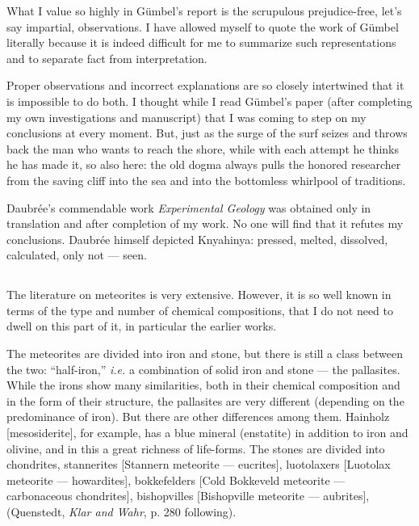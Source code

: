 \documentclass[a4paper, 12pt, oneside]{article}
\begin{document}
What I value so highly in Gümbel's report is the scrupulous prejudice-free, let's say impartial, observations. I have allowed myself to quote the work of Gümbel literally because it is indeed difficult for me to summarize such representations and to separate fact from interpretation.

Proper observations and incorrect explanations are so closely intertwined that it is impossible to do both. I thought while I read Gümbel's paper (after completing my own investigations and manuscript) that I was coming to step on my conclusions at every moment. But, just as the surge of the surf seizes and throws back the man who wants to reach the shore, while with each attempt he thinks he has made it, so also here: the old dogma always pulls the honored researcher from the saving cliff into the sea and into the bottomless whirlpool of traditions.

Daubrée's commendable work \emph{Experimental Geology} was obtained only in translation and after completion of my work. No one will find that it refutes my conclusions. Daubrée himself depicted Knyahinya: pressed, melted, dissolved, calculated, only not --- seen.
\clearpage
\subsection{}
\paragraph*{}
The literature on meteorites is very extensive. However, it is so well known in terms of the type and number of chemical compositions, that I do not need to dwell on this part of it, in particular the earlier works.

The meteorites are divided into iron and stone, but there is still a class between the two: ``half-iron,'' \emph{i.e.} a combination of solid iron and stone --- the pallasites. While the irons show many similarities, both in their chemical composition and in the form of their structure, the pallasites are very different (depending on the predominance of iron). But there are other differences among them. Hainholz [mesosiderite], for example, has a blue mineral (enstatite) in addition to iron and olivine, and in this a great richness of life-forms. The stones are divided into chondrites, stannerites [Stannern meteorite --- eucrites], luotolaxers [Luotolax meteorite --- howardites], bokkefelders [Cold Bokkeveld meteorite --- carbonaceous chondrites], bishopvilles [Bishopville meteorite --- aubrites], (Quenstedt, \emph{Klar and Wahr}, p. 280 following).
\end{document}
